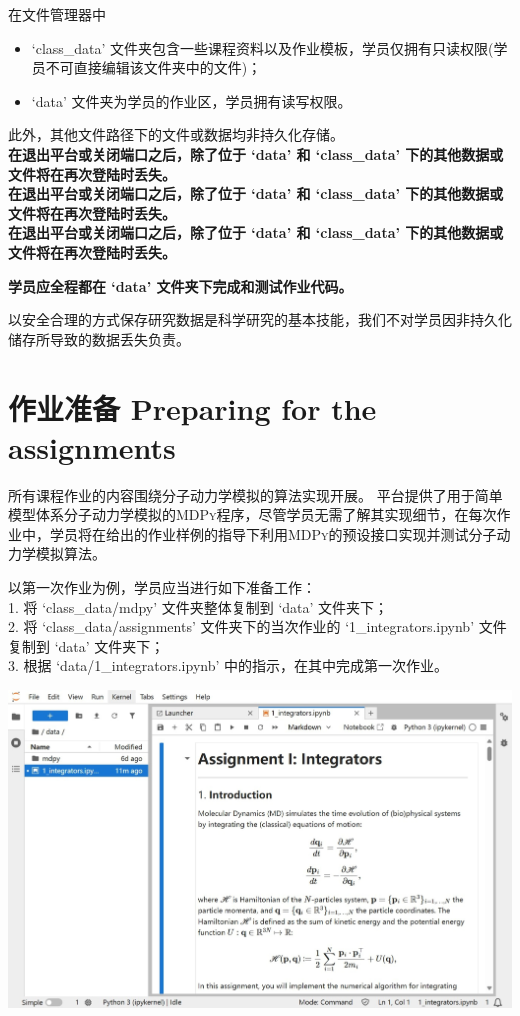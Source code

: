 \documentclass{article}
\begin{document}
在文件管理器中
\begin{itemize}
  \item `class\_data' 文件夹包含一些课程资料以及作业模板，学员仅拥有只读权限(学员不可直接编辑该文件夹中的文件)；
  \item `data' 文件夹为学员的作业区，学员拥有读写权限。
\end{itemize}

此外，其他文件路径下的文件或数据均非持久化存储。\\
{\bf
\color{myred} 在退出平台或关闭端口之后，除了位于 `data' 和 `class\_data' 下的其他数据或文件将在再次登陆时丢失。\\
\color{myblue}在退出平台或关闭端口之后，除了位于 `data' 和 `class\_data' 下的其他数据或文件将在再次登陆时丢失。\\
\color{myred} 在退出平台或关闭端口之后，除了位于 `data' 和 `class\_data' 下的其他数据或文件将在再次登陆时丢失。}

{\bf 学员应全程都在 `data' 文件夹下完成和测试作业代码。}

以安全合理的方式保存研究数据是科学研究的基本技能，我们不对学员因非持久化储存所导致的数据丢失负责。

\section*{作业准备 Preparing for the assignments}

所有课程作业的内容围绕分子动力学模拟的算法实现开展。
平台提供了用于简单模型体系分子动力学模拟的\textsc{MDPy}程序，尽管学员无需了解其实现细节，在每次作业中，学员将在给出的作业样例的指导下利用\textsc{MDPy}的预设接口实现并测试分子动力学模拟算法。

以第一次作业为例，学员应当进行如下准备工作：\\
1. 将 `class\_data/mdpy' 文件夹整体复制到 `data' 文件夹下；\\
2. 将 `class\_data/assignments' 文件夹下的当次作业的 `1\_integrators.ipynb' 文件复制到 `data' 文件夹下；\\
3. 根据 `data/1\_integrators.ipynb' 中的指示，在其中完成第一次作业。

\centerline{\includegraphics[scale=0.8]{figs/system1.jpg}}
\end{document}
